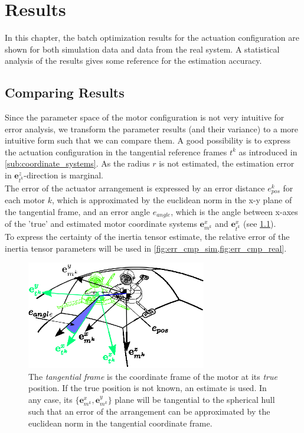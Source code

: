 \chapter{Results}
\label{chap:simulation_results}
In this chapter, the batch optimization results for the actuation configuration are shown for both simulation data and data from the real system.
A statistical analysis of the results gives some reference for the estimation accuracy.

\section{Comparing Results}
\label{sec:comparing_results}
Since the parameter space of the motor configuration is not very intuitive for error analysis,
we transform the parameter results (and their variance) to a more intuitive form such that we can compare them.
A good possibility is to express the actuation configuration in the tangential reference frames $t^k$ as introduced in \cref{sub:coordinate_systems}.
As the radius $r$ is not estimated, the estimation error in
$ \mathbf{e}_{t^k}^z $-direction is marginal.
\\
The error of the actuator arrangement is expressed by an error distance $e_{pos}^k$ for each motor $k$, which is approximated by the euclidean norm in the x-y plane of the tangential frame,
and an error angle $e_{angle}$, which is the angle between x-axes of the 'true' and estimated motor coordinate systems $\mathbf{e}_{m^k}^x$ and $\mathbf{e}_{t^k}^x$
(see \ref{fig:tangential_frame}).
\\
To express the certainty of the inertia tensor estimate, the relative error of the inertia tensor parameters will be used in \cref{fig:err_cmp_sim,fig:err_cmp_real}.

\begin{figure}[hbtp]
\captionsetup{width=0.9\textwidth}
\centering
\includegraphics[width = 0.7\textwidth]{images/tangential_frame.eps}
\caption{The \textit{tangential frame} is the coordinate frame of the motor at its \textit{true} position. If the true position is not known, an estimate is used. In any case, its $\lbrace \mathbf{e}^x_{m^k} , \mathbf{e}^y_{m^k} \rbrace$ plane will be tangential to the spherical hull such that an error of the arrangement can be approximated by the euclidean norm in the tangential coordinate frame.}
\label{fig:tangential_frame}
\end{figure}

